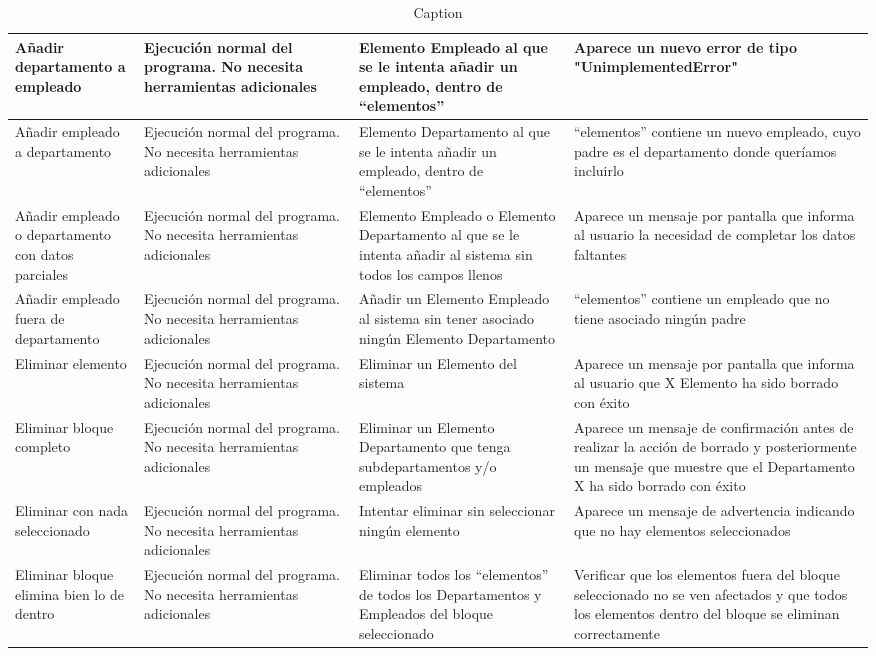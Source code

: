 \documentclass{article}
\begin{document}
\begin{table}
\begin{tabular}{|>{\raggedright\arraybackslash}p{0.15\linewidth}|>{\raggedright\arraybackslash}p{0.25\linewidth}|>{\raggedright\arraybackslash}p{0.25\linewidth}|>{\raggedright\arraybackslash}p{0.35\linewidth}|}
         Añadir departamento a empleado&  Ejecución normal del programa. No necesita herramientas adicionales&  Elemento Empleado al que se le intenta añadir un empleado, dentro de “elementos”&Aparece un nuevo error de tipo "UnimplementedError"\\ \hline 
         Añadir empleado a departamento&  Ejecución normal del programa. No necesita herramientas adicionales&  Elemento Departamento al que se le intenta añadir un empleado, dentro de “elementos”&“elementos” contiene un nuevo empleado, cuyo padre es el departamento donde queríamos incluirlo\\ \hline 
         Añadir empleado o departamento con datos parciales&  Ejecución normal del programa. No necesita herramientas adicionales&  Elemento Empleado o Elemento Departamento al que se le intenta añadir al sistema sin todos los campos llenos&Aparece un mensaje por pantalla que informa al usuario la necesidad de completar los datos faltantes\\ \hline 
         Añadir empleado fuera de departamento&  Ejecución normal del programa. No necesita herramientas adicionales&  Añadir un Elemento Empleado al sistema sin tener asociado ningún Elemento Departamento&“elementos” contiene un empleado que no tiene asociado ningún padre\\ \hline 
         Eliminar elemento&  Ejecución normal del programa. No necesita herramientas adicionales&  Eliminar un Elemento del sistema&Aparece un mensaje por pantalla que informa al usuario que X Elemento ha sido borrado con éxito\\ \hline 
         Eliminar bloque completo&  Ejecución normal del programa. No necesita herramientas adicionales&  Eliminar un Elemento Departamento que tenga subdepartamentos y/o empleados&Aparece un mensaje de confirmación antes de realizar la acción de borrado y posteriormente un mensaje que muestre que el Departamento X ha sido borrado con éxito\\ \hline 
         Eliminar con nada seleccionado&  Ejecución normal del programa. No necesita herramientas adicionales&  Intentar eliminar sin seleccionar ningún elemento&Aparece un mensaje de advertencia indicando que no hay elementos seleccionados\\ \hline 
         Eliminar bloque elimina bien lo de dentro&  Ejecución normal del programa. No necesita herramientas adicionales&  Eliminar todos los “elementos” de todos los Departamentos y Empleados del bloque seleccionado&Verificar que los elementos fuera del bloque seleccionado no se ven afectados y que todos los elementos dentro del bloque se eliminan correctamente\\ \hline
    \end{tabular}
    \caption{Caption}
    \label{tab:my_label}
\end{table}
\end{document}
